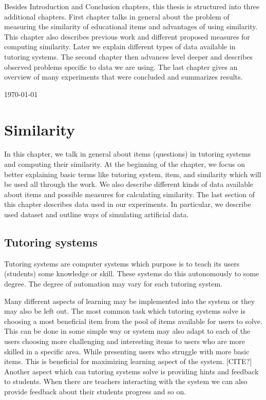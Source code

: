 \documentclass[
  digital, %
  table,   %
  nolof,     %
  nolot,     %
  nocover
]{fithesis3}
\begin{document}

Besides Introduction and Conclusion chapters, this thesis is structured into three additional chapters. First chapter talks in general about the problem of measuring the similarity of educational items and advantages of using similarity. This chapter also describes previous work and different proposed measures for computing similarity. Later we explain different types of data available in tutoring systems. The second chapter then advances level deeper and describes observed problems specific to data we are using.
The last chapter gives an overview of many experiments that were concluded and summarizes results.

\today %

\chapter{Similarity}



In this chapter, we talk in general about items (questions) in tutoring systems and computing their similarity. At the beginning of the chapter, we focus on better explaining basic terms like tutoring system, item, and similarity which will be used all through the work. We also describe different kinds of data available about items and possible measures for calculating similarity.
The last section of this chapter describes data used in our experiments. In particular, we describe used dataset and outline ways of simulating artificial data.


\section{Tutoring systems}\label{tutoring-systems}

Tutoring systems are computer systems which purpose is to teach its users (students) some knowledge or skill. These systems do this autonomously to some degree. The degree of automation may vary for each tutoring system.


Many different aspects of learning may be implemented into the system or they may also be left out. The most common task which tutoring systems solve is choosing a most beneficial item from the pool of items available for users to solve. This can be done in some simple way or system may also adapt to each of the users choosing more challenging and interesting items to users who are more skilled in a specific area. While presenting users who struggle with more basic items. This is beneficial for maximizing learning aspect of the system. [CITE?] Another aspect which can tutoring systems solve is providing hints and feedback to students. When there are teachers interacting with the system we can also provide feedback about their students progress and so on.
\end{document}
